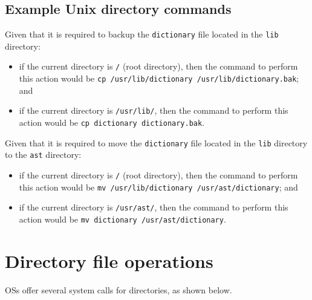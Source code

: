 \documentclass[a4paper]{systems-software}
\begin{document}
\subsection*{Example Unix directory commands}

Given that it is required to backup the \texttt{dictionary} file located in the \texttt{lib} directory:
\begin{itemize}
	\item if the current directory is \texttt{/} (root directory), then the command to perform this action would be \texttt{cp /usr/lib/dictionary /usr/lib/dictionary.bak}; and
	\item if the current directory is \texttt{/usr/lib/}, then the command to perform this action would be \texttt{cp dictionary dictionary.bak}.
\end{itemize}

Given that it is required to move the \texttt{dictionary} file located in the \texttt{lib} directory to the \texttt{ast} directory:
\begin{itemize}
	\item if the current directory is \texttt{/} (root directory), then the command to perform this action would be \texttt{mv /usr/lib/dictionary /usr/ast/dictionary}; and
	\item if the current directory is \texttt{/usr/ast/}, then the command to perform this action would be \texttt{mv dictionary /usr/ast/dictionary}.
\end{itemize}


\newpage

\section*{Directory file operations}

OSs offer several system calls for directories, as shown below.
\end{document}
